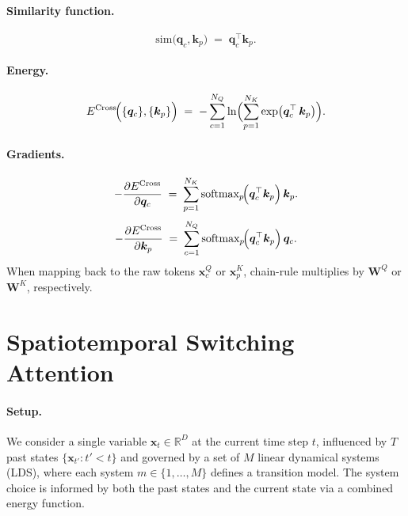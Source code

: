 \documentclass{article}
\begin{document}
    \paragraph{Similarity function.}
    \[
    \mathrm{sim}\bigl(\bm{q}_c, \bm{k}_p\bigr)
    \;=\;
    \bm{q}_c^\top \bm{k}_p.
    \]
    
    \paragraph{Energy.}
    \begin{equation}
    E^{\mathrm{Cross}}\!\Bigl(\{\bm{q}_c\}, \{\bm{k}_p\}\Bigr)
    \;=\;
    -\sum_{c=1}^{N_Q}
    \ln \Bigl(\sum_{p=1}^{N_K}
    \exp\bigl(\bm{q}_c^\top\,\bm{k}_p\bigr)\Bigr).
    \end{equation}
    
    \paragraph{Gradients.}
    \begin{equation}
    -\frac{\partial E^{\mathrm{Cross}}}{\partial \bm{q}_c}
    \;=\;
    \sum_{p=1}^{N_K}
    \text{softmax}_{p}\!\Bigl(\bm{q}_c^\top \bm{k}_p \Bigr)\,
    \bm{k}_p.
    \end{equation}
    \begin{equation}
    -\frac{\partial E^{\mathrm{Cross}}}{\partial \bm{k}_p}
    \;=\;
    \sum_{c=1}^{N_Q}
    \text{softmax}_{p}\!\Bigl(\bm{q}_c^\top \bm{k}_p \Bigr)\,
    \bm{q}_c.
    \end{equation}
    When mapping back to the raw tokens \(\bm{x}^Q_c\) or \(\bm{x}^K_p\), chain-rule multiplies by \(\bm{W}^Q\) or \(\bm{W}^K\), respectively.

\section{Spatiotemporal Switching Attention}

\paragraph{Setup.} 
We consider a single variable \(\bm{x}_t \in \mathbb{R}^D\) at the current time step \(t\), influenced by \(T\) past states \(\{\bm{x}_{t'} : t' < t\}\) and governed by a set of \(M\) linear dynamical systems (LDS), where each system \(m \in \{1, \dots, M\}\) defines a transition model. The system choice is informed by both the past states and the current state via a combined energy function.
\end{document}
